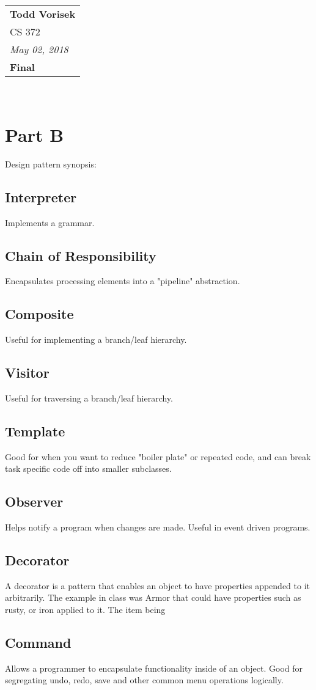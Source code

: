 \documentclass{article}
\begin{document}
  \null\hfill\begin{tabular}[t]{l@{}}
    \textbf{Todd Vorisek} \\
    CS 372 \\
    \textit{May 02, 2018} \\
    \textbf{Final}
  \end{tabular}\\

  \section*{Part B}
    Design pattern synopsis:
    \subsection*{Interpreter}
    Implements a grammar.
    \subsection*{Chain of Responsibility}
    Encapsulates processing elements into a "pipeline" abstraction.
    \subsection*{Composite}
    Useful for implementing a branch/leaf hierarchy. 
    \subsection*{Visitor}
    Useful for traversing a branch/leaf hierarchy. 
    \subsection*{Template}
    Good for when you want to reduce "boiler plate" or repeated code, and can break task specific code off into smaller subclasses.
    \subsection*{Observer}
    Helps notify a program when changes are made. Useful in event driven programs.
    \subsection*{Decorator}
    A decorator is a pattern that enables an object to have properties appended to it arbitrarily. The example in class was Armor that could have properties such as rusty, or iron applied to it. The item being 
    \subsection*{Command}
    Allows a programmer to encapsulate functionality inside of an object. Good for segregating undo, redo, save and other common menu operations logically.
\end{document}
